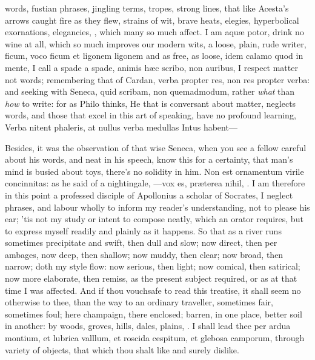 {words, fustian phrases, jingling terms, tropes, strong lines, that like
Acesta's arrows caught fire as they flew, strains of wit, brave
heats, elegies, hyperbolical exornations, elegancies, \etc, which many
so much affect. I am aqu\ae{} potor, drink no wine at all, which so
much improves our modern wits, a loose, plain, rude writer, ficum, voco
ficum et ligonem ligonem and as free, as loose, idem calamo quod in
mente, I call a spade a spade, animis h\ae{}c scribo, non auribus, I
respect matter not words; remembering that of Cardan, verba propter
res, non res propter verba: and seeking with Seneca, quid scribam, non
quemadmodum, rather \emph{what} than \emph{how} to write: for as Philo thinks,
He that is conversant about matter, neglects words, and those that
excel in this art of speaking, have no profound learning,
Verba nitent phaleris, at nullus verba medullas
Intus habent---

Besides, it was the observation of that wise Seneca, when you see
a fellow careful about his words, and neat in his speech, know this for
a certainty, that man's mind is busied about toys, there's no solidity
in him. Non est ornamentum virile concinnitas: as he said of a
nightingale, ---vox es, pr\ae{}terea nihil, \etc. I am therefore in this
point a professed disciple of Apollonius a scholar of Socrates, I
neglect phrases, and labour wholly to inform my reader's understanding,
not to please his ear; 'tis not my study or intent to compose neatly,
which an orator requires, but to express myself readily and plainly as
it happens. So that as a river runs sometimes precipitate and swift,
then dull and slow; now direct, then per ambages, now deep, then
shallow; now muddy, then clear; now broad, then narrow; doth my style
flow: now serious, then light; now comical, then satirical; now more
elaborate, then remiss, as the present subject required, or as at that
time I was affected. And if thou vouchsafe to read this treatise, it
shall seem no otherwise to thee, than the way to an ordinary traveller,
sometimes fair, sometimes foul; here champaign, there enclosed; barren,
in one place, better soil in another: by woods, groves, hills, dales,
plains, \etc. I shall lead thee per ardua montium, et lubrica valllum, et
roscida cespitum, et glebosa camporum, through variety of objects,
that which thou shalt like and surely dislike.

}
